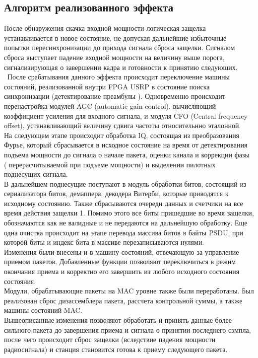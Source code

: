 \documentclass{llncs}
\begin{document}
\subsection{Алгоритм реализованного эффекта}
После обнаружения скачка входной мощности логическая защелка устанавливается в новое состояние, не допуская дальнейшие избыточные попытки пересинхронизации до прихода сигнала сброса защелки. Сигналом сброса выступает падение входной мощности на величину выше порога, сигнализирующая о завершении кадра и готовности к принятию следующих.
\\\
После срабатывания данного эффекта происходит переключение машины состояний, реализованной внутри FPGA USRP в состояние поиска синхронизации (детектирование преамбулы ). Одновременно происходит перенастройка модулей AGC (automatic gain control), вычисляющий коэффициент усиления для входного сигнала, и модуля CFO (Central frequency offset), устанавливающий величину сдвига частоты относительнно эталонной. %
\\
На следующем этапе происходит обработка IQ, состоящая из преобразования Фурье, который сбрасывается в исходное состояние на время от детектирования подъема мощности до сигнала о начале пакета, оценки канала и коррекции фазы ( перерасчитываемой при подъеме мощности) и выделении пилотных поднесущих сигнала.
\\
В дальнейшем поднесущие поступают в модуль обработки битов, состоящий из  сериализатора битов, демаппера, декодера Витерби, которые приводятся к исходному состоянию. Также сбрасываются  очереди данных и счетчики на все время действия защелки 1. Помимо этого все биты пришедшие во время защелки, обозначаются как не валидные и не передаются на дальнейшую обработку. Еще одна очистка происходит на этапе перевода массива битов в байты PSDU, при которой биты и индекс бита в массиве  перезаписываются нулями.
\\
Изменения были внесены и в машину состояний, отвечающую за управление приемом пакетов. Добавленные функции позволяют переключиться в режим окончания приема и корректно его завершить из любого исходного состояния  состояния. 
\\
Модули, обрабатывающие пакеты на MAC уровне также были переработаны. Был реализован сброс дизассемблера пакета, рассчета контрольной суммы, а также машины состояний MAC.
\\
Вышеописанные изменения позволяют  обработать и принять данные более сильного пакета до завершения приема и сигнала о принятии последнего сэмпла, после чего происходит сброс защелки (вследствие падения мощности радиосигнала) и станция становится готова к приему следующего пакета.
\end{document}
